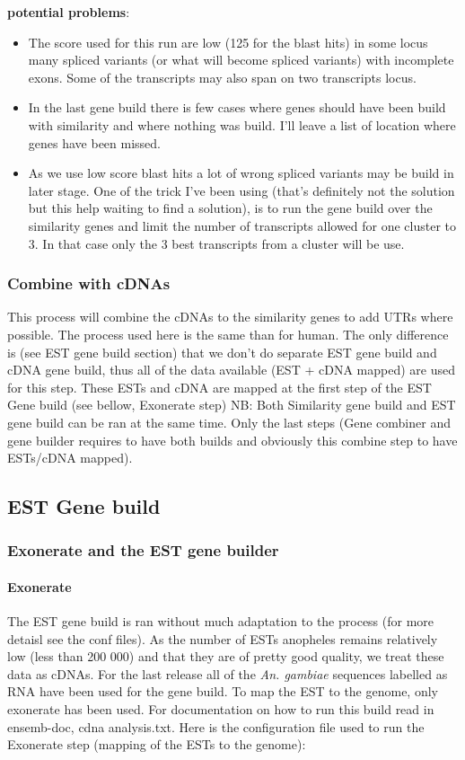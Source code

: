 \documentclass[a4paper,10pt]{article}
\begin{document}
\textbf{potential problems}: 
\begin{itemize}
\item The score used for this run are low (125 for the blast hits) in some locus many spliced variants (or what will become spliced variants) with incomplete exons. Some of the transcripts may also span on two transcripts locus.
\item In the last gene build there is few cases where genes should have been build with similarity and where nothing was build. I'll leave a list of location where genes have been missed.
\item As we use low score blast hits a lot of wrong spliced variants may be build in later stage. One of the trick I've been using (that's definitely not the solution but this help waiting to find a solution), is to run the gene build over the similarity genes and limit the number of transcripts allowed for one cluster to 3. In that case only the 3 best transcripts from a cluster will be use.

\end{itemize}

\subsubsection{Combine with cDNAs}
This process will combine the cDNAs to the similarity genes to add UTRs where possible. The process used here is the same than for human. The only difference is (see EST gene build section) that we don't do separate EST gene build and cDNA gene build, thus all of the data available (EST + cDNA mapped) are used for this step. These ESTs and cDNA are mapped at the first step of the EST Gene build (see bellow, Exonerate step)
NB: Both Similarity gene build and EST gene build can be ran at the same time. Only the last steps (Gene combiner and gene builder requires to have both builds and obviously this combine step to have ESTs/cDNA mapped).

\subsection{EST Gene build}
\subsubsection{Exonerate and the EST gene builder}
\paragraph{Exonerate}
The EST gene build is ran without much adaptation to the process (for more detaisl see the conf files). As the number of ESTs anopheles remains relatively low (less than 200 000) and that they are of pretty good quality, we treat these data as cDNAs. For the last release all of the \textit{An. gambiae} sequences labelled as RNA have been used for the gene build. 
To map the EST to the genome, only exonerate has been used.
For documentation on how to run this build read in ensemb-doc, cdna analysis.txt.
Here is the configuration file used to run the Exonerate step (mapping of the ESTs to the genome):
\end{document}

